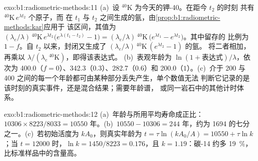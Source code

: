 \begin{solution}{exo:b1:radiometric-methods:11}
(a)~设 ${}^{40}\mathrm{K}$ 为今天的钾-40。在距今 $t_2$ 的时刻
共有 ${}^{40}\mathrm{K}\,e^{\lambda t_2}$ 个原子，而
在 $t_1$ 与 $t_2$ 之间生成的氩，由\cref{prop:b1:radiometric-methods:kar}应用于
该区间，其值为 $(\lambda_e/\lambda)\,{}^{40}\mathrm{K}\,e^{\lambda
t_2}\bigl(e^{\lambda (t_1 - t_2)} - 1\bigr) = (\lambda_e/\lambda)\,
{}^{40}\mathrm{K}\,\bigl(e^{\lambda t_1} - e^{\lambda t_2}\bigr)$。其中留存的
比例为 $1 - f$。自 $t_2$ 以来，封闭又生成了
$(\lambda_e/\lambda)\,{}^{40}\mathrm{K}\,(e^{\lambda t_2} - 1)$ 的氩。
将二者相加，再乘以 $\lambda/(\lambda_e\,{}^{40}\mathrm{K})$，即得该表达式。
(b)~表观年龄为 $\ln(1 + \text{表达式})/\lambda$，依次为
\qty{400.0}{\Ma}（$f = 0$）、\qty{342.3}{\Ma}（$0.3$）、\qty{282.7}{\Ma}（$0.6$）和
\qty{200.0}{\Ma}（$1$）。(c)~介于 \qty{200}{\Ma} 与
\qty{400}{\Ma} 之间的每一个年龄都可由某种部分丢失产生，单个数值无法
判断它记录的是该时刻的真实事件，还是混合结果；需要年龄谱，
或同一岩石中的其他计时体系。
\end{solution}

\begin{solution}{exo:b1:radiometric-methods:12}
(a)~年龄与所用平均寿命成正比：$10306 \times 8223/8033 =
\num{10550}$ 年。(b)~$10550 - 10306 = 244$ 年，约为
\num{1694} 的七分之一。(c)~若初始活度为 $k A_0$，则真实年龄为 $t = \tau
\ln(k A_0/A) = \num{10550} + \tau \ln k$；当 $t = \num{12000}$ 时，$\ln k =
1450/8223 = 0.176$，且 $k = 1.19$：碳-14 约多 \qty{19}{\percent}，
比标准样品中的含量高。
\end{solution}


